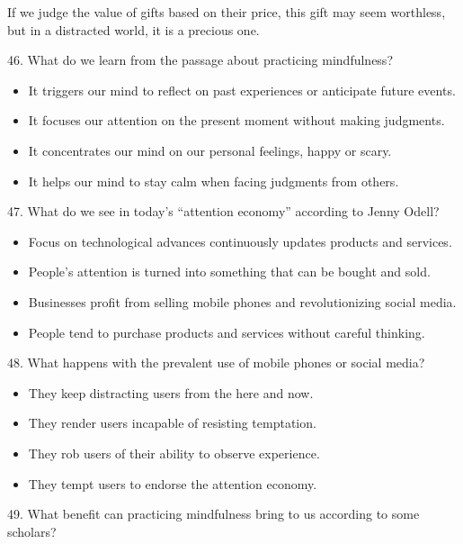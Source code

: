 \documentclass[UTF8,11pt]{ctexart}
\begin{document}
If we judge the value of gifts based on their price, this gift may seem worthless, but in a distracted world, it is a precious one.


46. What do we learn from the passage about practicing mindfulness?


\begin{itemize}[leftmargin=2em,itemsep=.2em,topsep=.4em]\item[A.] It triggers our mind to reflect on past experiences or anticipate future events.
\item[B.] It focuses our attention on the present moment without making judgments.
\item[C.] It concentrates our mind on our personal feelings, happy or scary.
\item[D.] It helps our mind to stay calm when facing judgments from others.
\end{itemize}

47. What do we see in today’s “attention economy” according to Jenny Odell?


\begin{itemize}[leftmargin=2em,itemsep=.2em,topsep=.4em]\item[A.] Focus on technological advances continuously updates products and services.
\item[B.] People’s attention is turned into something that can be bought and sold.
\item[C.] Businesses profit from selling mobile phones and revolutionizing social media.
\item[D.] People tend to purchase products and services without careful thinking.
\end{itemize}

48. What happens with the prevalent use of mobile phones or social media?


\begin{itemize}[leftmargin=2em,itemsep=.2em,topsep=.4em]\item[A.] They keep distracting users from the here and now.
\item[B.] They render users incapable of resisting temptation.
\item[C.] They rob users of their ability to observe experience.
\item[D.] They tempt users to endorse the attention economy.
\end{itemize}

49. What benefit can practicing mindfulness bring to us according to some scholars?
\end{document}
